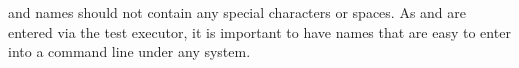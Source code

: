 \gdsuite{} and \gdjob{} names should not contain any special characters or spaces. As \gdsuites{} and \gdjobs{} are entered via the test executor, it is important to have names that are easy to enter into a command line under any system. 

